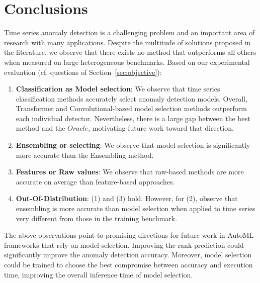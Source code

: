\vspace*{-0.2cm}

\section{Conclusions}
\label{sec:conclusions}

Time series anomaly detection is a challenging problem and an important area of research with many applications. %
Despite the multitude of solutions proposed in the literature, we observe that there exists no method that outperforms all others when measured on large heterogeneous benchmarks. Based on our experimental evaluation %
(cf. questions of Section~\ref{sec:objective}): 

\begin{enumerate}[noitemsep, topsep=0pt, parsep=0pt, partopsep=0pt, leftmargin=0.5cm]
	\item \textbf{Classification as Model selection}: We observe that time series classification methods accurately select anomaly detection models. Overall, Transformer and Convolutional-based model selection methods outperform each individual detector. Nevertheless, there is a large gap between the best method and the $Oracle$, motivating future work toward that direction.
	\item \textbf{Ensembling or selecting}: We observe that model selection is significantly more accurate than the Ensembling method.
	\item \textbf{Features or Raw values}: We observe that raw-based methods are more accurate on average than feature-based approaches.
	\item \textbf{Out-Of-Distribution}: (1) and (3) hold. However, for (2),  observe that ensembling is more accurate than model selection when applied to time series very different from those in the training benchmark.
\end{enumerate}

The above observations point to promising directions for future work in AutoML frameworks that rely on model selection. %
Improving the rank prediction could significantly improve the anomaly detection accuracy. Moreover, model selection could be trained to choose the best compromise between accuracy and execution time, improving the overall inference time of model selection. %

